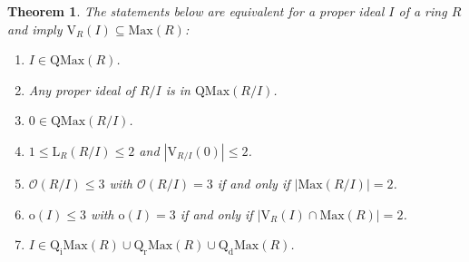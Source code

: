 \documentclass[12pt,leqno]{amsart}
\newtheorem{theorem}{Theorem}[section]
\theoremstyle{definition}
\begin{document}
\begin{theorem}\label{2.3} The statements below are equivalent for a proper ideal $I$ of a ring $R$ and imply $\mathrm{V}_R(I)\subseteq\mathrm{Max}(R)$:
\begin{enumerate}
\item  $I\in\mathrm{QMax}(R)$.
\item Any proper ideal of $R/I$ is in $\mathrm{QMax}(R/I)$.
\item $0\in\mathrm{QMax}(R/I)$.
\item $1\leq\mathrm{L}_R(R/I)\leq 2$ and $|\mathrm{V}_{R/I}(0)|\leq 2$. 
\item $\mathcal O(R/I)\leq 3$ with $\mathcal O(R/I)=3$ if and only if $|\mathrm{Max}(R/I)|=2$.
\item $\mathrm o(I)\leq 3$ with $\mathrm o(I)=3$ if and only if $|\mathrm {V}_R(I)\cap \mathrm{Max}(R)|= 2$.
\item $I\in\mathrm{Q_iMax}(R)\cup\mathrm{Q_rMax}(R)\cup\mathrm {Q_dMax}( R)$. 
\end{enumerate}
\end{theorem}
\end{document}
